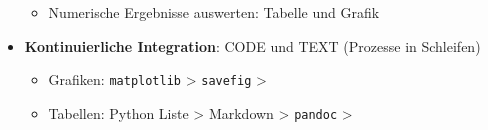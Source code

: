 \begin{itemize}
\begin{itemize}
		\item Numerische Ergebnisse auswerten: Tabelle und Grafik
	\end{itemize}
	\item {\color{gray}\textbf{Kontinuierliche Integration}: CODE und TEXT (Prozesse in Schleifen)
	\begin{itemize}
		\item Grafiken: \texttt{matplotlib} > \texttt{savefig} > 
		\item Tabellen: Python Liste > Markdown > \texttt{pandoc} >  
	\end{itemize}
}
\end{itemize}

